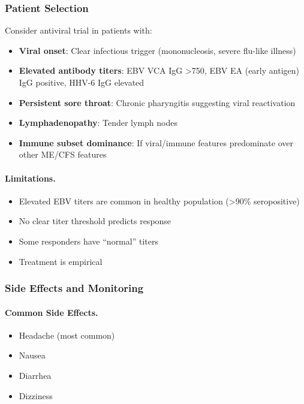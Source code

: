 \subsubsection{Patient Selection}

Consider antiviral trial in patients with:
\begin{itemize}
    \item \textbf{Viral onset}: Clear infectious trigger (mononucleosis, severe flu-like illness)
    \item \textbf{Elevated antibody titers}: EBV VCA IgG >750, EBV EA (early antigen) IgG positive, HHV-6 IgG elevated
    \item \textbf{Persistent sore throat}: Chronic pharyngitis suggesting viral reactivation
    \item \textbf{Lymphadenopathy}: Tender lymph nodes
    \item \textbf{Immune subset dominance}: If viral/immune features predominate over other ME/CFS features
\end{itemize}

\paragraph{Limitations.}
\begin{itemize}
    \item Elevated EBV titers are common in healthy population (>90\% seropositive)
    \item No clear titer threshold predicts response
    \item Some responders have ``normal'' titers
    \item Treatment is empirical
\end{itemize}

\subsubsection{Side Effects and Monitoring}

\paragraph{Common Side Effects.}
\begin{itemize}
    \item Headache (most common)
    \item Nausea
    \item Diarrhea
    \item Dizziness
\end{itemize}

